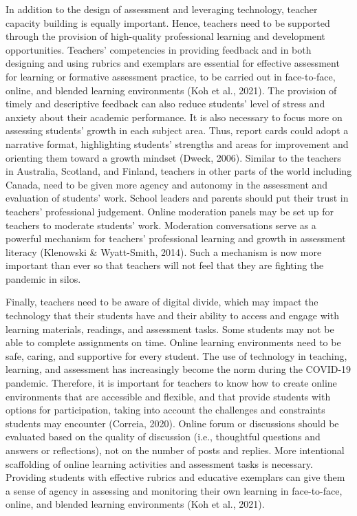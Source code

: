 \documentclass[
]{book}
\begin{document}
In addition to the design of assessment and leveraging technology, teacher capacity building is equally important. Hence, teachers need to be supported through the provision of high-quality professional learning and development opportunities. Teachers' competencies in providing feedback and in both designing and using rubrics and exemplars are essential for effective assessment for learning or formative assessment practice, to be carried out in face-to-face, online, and blended learning environments (Koh et al., 2021). The provision of timely and descriptive feedback can also reduce students' level of stress and anxiety about their academic performance. It is also necessary to focus more on assessing students' growth in each subject area. Thus, report cards could adopt a narrative format, highlighting students' strengths and areas for improvement and orienting them toward a growth mindset (Dweck, 2006). Similar to the teachers in Australia, Scotland, and Finland, teachers in other parts of the world including Canada, need to be given more agency and autonomy in the assessment and evaluation of students' work. School leaders and parents should put their trust in teachers' professional judgement. Online moderation panels may be set up for teachers to moderate students' work. Moderation conversations serve as a powerful mechanism for teachers' professional learning and growth in assessment literacy (Klenowski \& Wyatt-Smith, 2014). Such a mechanism is now more important than ever so that teachers will not feel that they are fighting the pandemic in silos.

Finally, teachers need to be aware of digital divide, which may impact the technology that their students have and their ability to access and engage with learning materials, readings, and assessment tasks. Some students may not be able to complete assignments on time. Online learning environments need to be safe, caring, and supportive for every student. The use of technology in teaching, learning, and assessment has increasingly become the norm during the COVID-19 pandemic. Therefore, it is important for teachers to know how to create online environments that are accessible and flexible, and that provide students with options for participation, taking into account the challenges and constraints students may encounter (Correia, 2020). Online forum or discussions should be evaluated based on the quality of discussion (i.e., thoughtful questions and answers or reflections), not on the number of posts and replies. More intentional scaffolding of online learning activities and assessment tasks is necessary. Providing students with effective rubrics and educative exemplars can give them a sense of agency in assessing and monitoring their own learning in face-to-face, online, and blended learning environments (Koh et al., 2021).
\end{document}
